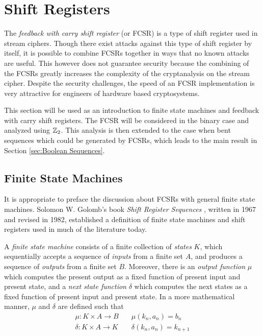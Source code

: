 \section{Shift Registers}\label{sec:shift-registers}
\par The {\it feedback with carry shift register} (or FCSR) is a type of
shift register used in stream ciphers. Though there exist attacks against
this type of shift register by itself, it is possible to combine FCSRs
together in ways that no known attacks are useful. This however does not
guarantee security because the combining of the FCSRs greatly increases the
complexity of the cryptanalysis on the stream cipher. Despite the security
challenges, the speed of an FCSR implementation is very attractive for
engineers of hardware based cryptosystems.

\par This section will be used as an introduction to finite state machines
and feedback with carry shift registers. The FCSR will be considered in the
binary case and analyzed using $\mathbb{Z}_2$. This analysis is then extended to
the case when bent sequences which could be generated by FCSRs, which leads to
the main result in Section \ref{sec:Boolean Sequences}.

\subsection{Finite State Machines}
\par It is appropriate to preface the discussion about FCSRs with general finite
state machines. Solomon W. Golomb's book {\em Shift Register Sequences}
\cite{bk:g82}, written in 1967 and revised in 1982, established a definition of
finite state machines and shift registers used in much of the literature today.

\begin{definition}\label{finite-state-machine}
  A {\em finite state machine} consists of a finite collection of {\em states}
  $K$, which sequentially accepts a sequence of {\em inputs} from a finite set
  $A$, and produces a sequence of {\em outputs} from a finite set
  $B$. Moreover, there is an {\em output function} $\mu$ which computes
  the present output as a fixed function of present input and present state,
  and a
  {\em next state function} $\delta$ which computes the next states as a fixed
  function of present input and present state. In a more mathematical manner,
  $\mu$ and $\delta$ are defined such that
  \begin{eqnarray}
    \mu:K \times A \rightarrow B \quad &\mu(k_n,a_n)=b_n \\
    \delta:K \times A \rightarrow K \quad &\delta(k_n,a_n)=k_{n+1}
  \end{eqnarray}
\end{definition}

